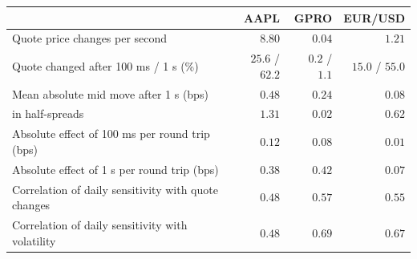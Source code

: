 \begin{tabular}{lrrr}
\toprule
 & AAPL & GPRO & EUR/USD \\
\midrule
Quote price changes per second & $8.80$ & $0.04$ & $1.21$ \\
Quote changed after 100 ms / 1 s (\%) & $25.6$ / $62.2$ & $0.2$ / $1.1$ & $15.0$ / $55.0$ \\
Mean absolute mid move after 1 s (bps) & $0.48$ & $0.24$ & $0.08$ \\
\quad in half-spreads & $1.31$ & $0.02$ & $0.62$ \\
\midrule
Absolute effect of 100 ms per round trip (bps) & $0.12$ & $0.08$ & $0.01$ \\
Absolute effect of 1 s per round trip (bps) & $0.38$ & $0.42$ & $0.07$ \\
\midrule
Correlation of daily sensitivity with quote changes & $0.48$ & $0.57$ & $0.55$ \\
Correlation of daily sensitivity with volatility & $0.48$ & $0.69$ & $0.67$ \\
\bottomrule
\end{tabular}
